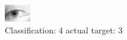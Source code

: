 \begin{figure}[h!]
\begin{center}
\includegraphics[width=0.60\columnwidth]{figures/ID1342_class_4_target_3.png}
\end{center}
\caption{ Classification: 4 actual target: 3}
\label{fig:ID1342_class_4_target_3}
\end{figure}
